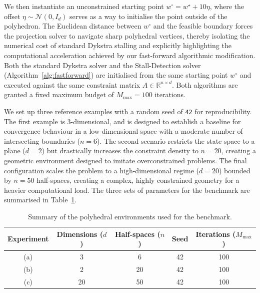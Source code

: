 We then instantiate an unconstrained starting point $w^\circ = w^\star + 10 \eta$, where the offset $\eta \sim \mathcal{N}(0, I_d)$ serves as a way to initialise the point outside of the polyhedron. The Euclidean distance between $w^\circ$ and the feasible boundary forces the projection solver to navigate sharp polyhedral vertices, thereby isolating the numerical cost of standard Dykstra stalling and explicitly highlighting the computational acceleration achieved by our fast-forward algorithmic modification. Both the standard Dykstra solver and the Stall-Detection solver (Algorithm~\ref{alg:fastforward}) are initialised from the same starting point $w^\circ$ and executed against the same constraint matrix $A \in \mathbb{R}^{n \times d}$. Both algorithms are granted a fixed maximum budget of $M_{\max} = 100$ iterations.


We set up three reference examples with a random seed of \texttt{42} for reproducibility. The first example is 3-dimensional, and is designed to establish a baseline for convergence behaviour in a low-dimensional space with a moderate number of intersecting boundaries ($n=6$). The second scenario restricts the state space to a plane ($d=2$) but drastically increases the constraint density to $n=20$, creating a geometric environment designed to imitate overconstrained problems. The final configuration scales the problem to a high-dimensional regime ($d=20$) bounded by $n=50$ half-spaces, creating a complex, highly constrained geometry for a heavier computational load. The three sets of parameters for the benchmark are summarised in Table~\ref{tab:benchmark_summary}.

\begin{table}[htbp]
    \centering
    \caption{Summary of the polyhedral environments used for the benchmark.}
    \label{tab:benchmark_summary}
    \begin{tabular}{@{}ccccc@{}}
        \toprule
        Experiment & Dimensions ($d$) & Half-spaces ($n$) & Seed & Iterations ($M_{\max}$) \\
        \midrule
        (a) & 3 & 6 & 42 & 100 \\
        (b) & 2 & 20 & 42 & 100 \\
        (c) & 20 & 50 & 42 & 100 \\
        \bottomrule
    \end{tabular}
\end{table}

